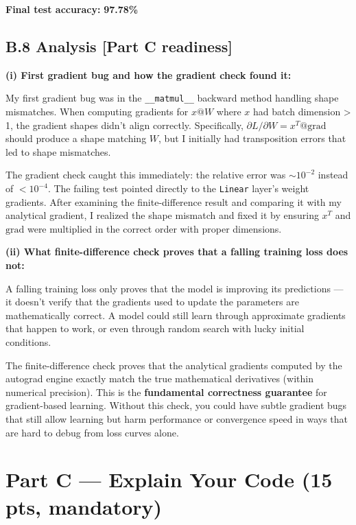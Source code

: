 \documentclass[11pt,a4paper]{article}
\begin{document}
\textbf{Final test accuracy:} \textbf{97.78\%}

\subsection*{B.8 Analysis \hfill [Part C readiness]}

\textbf{(i) First gradient bug and how the gradient check found it:}

My first gradient bug was in the \texttt{\_\_matmul\_\_} backward method handling shape mismatches. When computing gradients for $x @ W$ where $x$ had batch dimension > 1, the gradient shapes didn't align correctly. Specifically, $\partial L/\partial W = x^T @ \text{grad}$ should produce a shape matching $W$, but I initially had transposition errors that led to shape mismatches.

The gradient check caught this immediately: the relative error was $\sim 10^{-2}$ instead of $< 10^{-4}$. The failing test pointed directly to the \texttt{Linear} layer's weight gradients. After examining the finite-difference result and comparing it with my analytical gradient, I realized the shape mismatch and fixed it by ensuring $x^T$ and $\text{grad}$ were multiplied in the correct order with proper dimensions.

\textbf{(ii) What finite-difference check proves that a falling training loss does not:}

A falling training loss only proves that the model is improving its predictions — it doesn't verify that the gradients used to update the parameters are mathematically correct. A model could still learn through approximate gradients that happen to work, or even through random search with lucky initial conditions.

The finite-difference check proves that the analytical gradients computed by the autograd engine exactly match the true mathematical derivatives (within numerical precision). This is the \textbf{fundamental correctness guarantee} for gradient-based learning. Without this check, you could have subtle gradient bugs that still allow learning but harm performance or convergence speed in ways that are hard to debug from loss curves alone.

\section{Part C --- Explain Your Code (15 pts, mandatory)}
\end{document}
